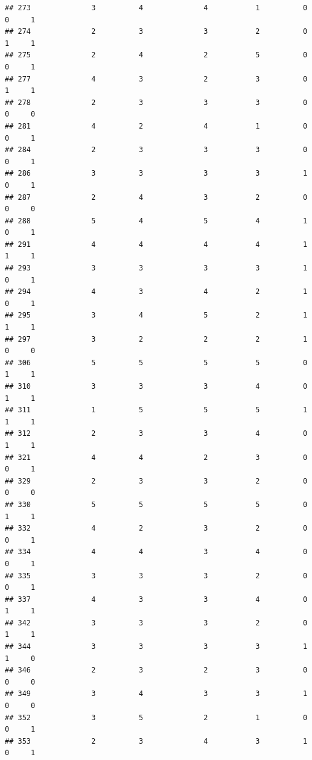 \documentclass[
]{article}
\begin{document}
\begin{verbatim}
## 273              3          4              4           1          0    0     1
## 274              2          3              3           2          0    1     1
## 275              2          4              2           5          0    0     1
## 277              4          3              2           3          0    1     1
## 278              2          3              3           3          0    0     0
## 281              4          2              4           1          0    0     1
## 284              2          3              3           3          0    0     1
## 286              3          3              3           3          1    0     1
## 287              2          4              3           2          0    0     0
## 288              5          4              5           4          1    0     1
## 291              4          4              4           4          1    1     1
## 293              3          3              3           3          1    0     1
## 294              4          3              4           2          1    0     1
## 295              3          4              5           2          1    1     1
## 297              3          2              2           2          1    0     0
## 306              5          5              5           5          0    1     1
## 310              3          3              3           4          0    1     1
## 311              1          5              5           5          1    1     1
## 312              2          3              3           4          0    1     1
## 321              4          4              2           3          0    0     1
## 329              2          3              3           2          0    0     0
## 330              5          5              5           5          0    1     1
## 332              4          2              3           2          0    0     1
## 334              4          4              3           4          0    0     1
## 335              3          3              3           2          0    0     1
## 337              4          3              3           4          0    1     1
## 342              3          3              3           2          0    1     1
## 344              3          3              3           3          1    1     0
## 346              2          3              2           3          0    0     0
## 349              3          4              3           3          1    0     0
## 352              3          5              2           1          0    0     1
## 353              2          3              4           3          1    0     1

\end{verbatim}
\end{document}
